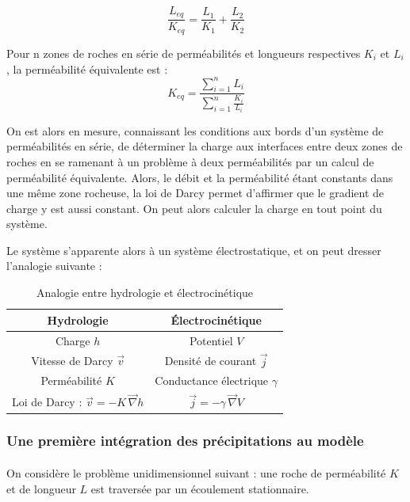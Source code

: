 \documentclass{article}
\begin{document}
$$ \dfrac{L_{eq}}{K_{eq}} = \dfrac{L_1}{K_1} + \dfrac{L_2}{K_2} $$

Pour n zones de roches en série de perméabilités et longueurs respectives $K_{i}$ et $L_{i}$, la perméabilité équivalente est :
$$K_{eq} = \frac{\sum\limits_{i=1}^{n}L_i}{\sum\limits_{i=1}^{n}\frac{K_i}{L_i}} $$

On est alors en mesure, connaissant les conditions aux bords d’un système de perméabilités en série, de déterminer la charge aux interfaces entre deux zones de roches en se ramenant à un problème à deux perméabilités par un calcul de perméabilité équivalente. Alors, le débit et la perméabilité étant constants dans une même zone rocheuse, la loi de Darcy permet d’affirmer que le gradient de charge y est aussi constant. On peut alors calculer la charge en tout point du système.

Le système s’apparente alors à un système électrostatique, et on peut dresser l’analogie suivante :

\begin{table}[H]
    \centering
    \caption{Analogie entre hydrologie et électrocinétique}
    \begin{tabular}{ |c |c |}
    \hline
     \textbf{Hydrologie} & \textbf{Électrocinétique} \\ 
     \hline
     Charge $h$ & Potentiel $V$ \\ 
     \hline
     Vitesse de Darcy $\Vec{v}$ & Densité de courant $\Vec{j}$  \\
     \hline
    Perméabilité $K$ & Conductance électrique $\gamma$  \\
     \hline
    Loi de Darcy : $\Vec{v} = -K\,\Vec{\nabla} h$ & $\Vec{j} = -\gamma\,\Vec{\nabla} V$  \\
     \hline
    \end{tabular}
    \label{tab:analogie_hydro_elec}
\end{table}

\subsubsection{Une première intégration des précipitations au modèle}
\paragraph{} On considère le problème unidimensionnel suivant : une roche de perméabilité $K$ et de longueur $L$ est traversée par un écoulement stationnaire.
\end{document}
